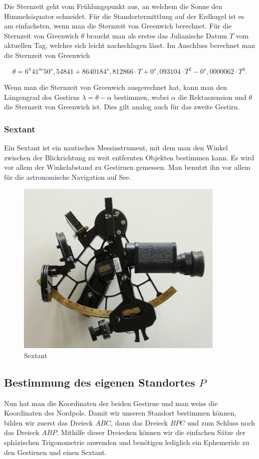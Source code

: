Die Sternzeit geht vom Frühlungspunkt aus, an welchem die Sonne den Himmelsäquator schneidet.
Für die Standortermittlung auf der Erdkugel ist es am einfachsten, wenn man die Sternzeit von Greenwich berechnet. 
Für die Sternzeit von Greenwich $\theta$ braucht man als erstes das Julianische Datum $T$ vom aktuellen Tag, welches sich leicht nachschlagen lässt.
Im Anschluss berechnet man die Sternzeit von Greenwich

\[\theta = 6^h 41^m 50^s,54841 + 8640184^s,812866 \cdot T + 0^s,093104 \cdot T^2 - 0^s,0000062 \cdot T^3.\]

Wenn man die Sternzeit von Greenwich ausgerechnet hat, kann man den Längengrad des Gestirns $\lambda = \theta - \alpha$ bestimmen, wobei $\alpha$ die Rektaszension und $\theta$ die Sternzeit von Greenwich ist.
Dies gilt analog auch für das zweite Gestirn.
\subsubsection{Sextant}
Ein Sextant ist ein nautisches Messinstrument, mit dem man den Winkel zwischen der Blickrichtung zu weit entfernten Objekten bestimmen kann. Es wird vor allem der Winkelabstand zu Gestirnen gemessen. 
Man benutzt ihn vor allem für die astronomische Navigation auf See.

\begin{figure}
	\begin{center}
		\includegraphics[width=10cm]{papers/nav/bilder/sextant.jpg}
		\caption[Sextant]{Sextant}
	\end{center}
\end{figure}
\subsection{Bestimmung des eigenen Standortes $P$}
Nun hat man die Koordinaten der beiden Gestirne und man weiss die Koordinaten des Nordpols.
Damit wir unseren Standort bestimmen können, bilden wir zuerst das Dreieck $ABC$, dann das Dreieck $BPC$ und zum Schluss noch das Dreieck $ABP$.
Mithilfe dieser Dreiecken können wir die einfachen Sätze der sphärischen Trigonometrie anwenden und benötigen lediglich ein Ephemeride zu den Gestirnen und einen Sextant.

